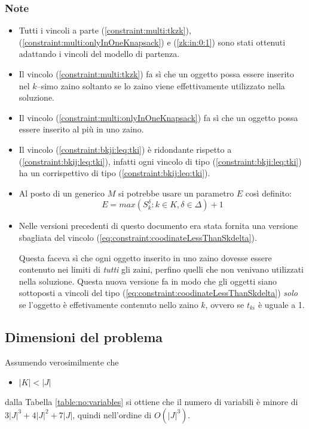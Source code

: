 \subsubsection{Note}
\begin{itemize}
\item Tutti i vincoli a parte (\ref{constraint:multi:tkzk}), 
(\ref{constraint:multi:onlyInOneKnapsack}) e (\ref{zk:in:0:1}) sono stati 
ottenuti adattando i vincoli del modello di partenza.
\item Il vincolo (\ref{constraint:multi:tkzk}) fa sì che un oggetto possa essere
 inserito nel $k$--simo zaino soltanto se lo zaino viene effettivamente 
 utilizzato nella soluzione.
\item Il vincolo (\ref{constraint:multi:onlyInOneKnapsack}) fa sì che un oggetto
possa essere inserito al più in uno zaino. 
\item Il vincolo (\ref{constraint:bkji:leq:tki}) è ridondante rispetto a 
(\ref{constraint:bkij:leq:tki}), infatti ogni vincolo di tipo
(\ref{constraint:bkji:leq:tki}) ha un corrispettivo di tipo 
(\ref{constraint:bkij:leq:tki}).
\item Al posto di un generico $M$ si potrebbe usare un 
parametro $E$ così definito:
$$
E = max(S_k^\delta : k \in K, \delta \in \Delta) + 1
$$ 
\item Nelle versioni precedenti di questo documento era stata fornita una
versione sbagliata del vincolo (\ref{eq:constraint:coodinateLessThanSkdelta}).

Questa faceva sì che ogni oggetto inserito in uno zaino 
dovesse essere contenuto nei limiti di \emph{tutti} gli zaini, perfino
quelli che non venivano utilizzati nella soluzione.
Questa nuova versione fa in modo che gli oggetti siano sottoposti a vincoli
del tipo (\ref{eq:constraint:coodinateLessThanSkdelta}) \emph{solo}
se l'oggetto è effetivamente contenuto nello zaino $k$, ovvero se 
$t_{ki}$ è uguale a 1.

\end{itemize}


\subsection{Dimensioni del problema}
\label{sec:orig:dimensioneDelProblema}
Assumendo verosimilmente che 
\begin{itemize}
	\item $|K| < |J|$
\end{itemize}  
dalla Tabella \ref{table:no:variables}
si ottiene che il numero di variabili è minore di $3|J|^3 + 4|J|^2 + 7|J|$, 
quindi nell'ordine di $O(|J|^3)$.



